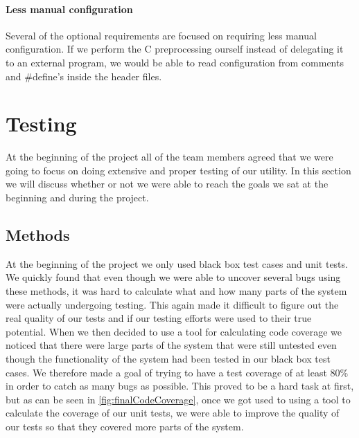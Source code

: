 \paragraph{Less manual configuration}
Several of the optional requirements are focused on requiring less manual
configuration. If we perform the C preprocessing ourself instead of delegating
it to an external program, we would be able to read configuration from
comments and \#define's inside the header files.

\section{Testing}
At the beginning of the project all of the team members agreed that we were going to focus on doing extensive and proper testing of our utility. In this section we will discuss whether or not we were able to reach the goals we sat at the beginning and during the project.

\subsection{Methods}
At the beginning of the project we only used black box test cases and unit tests. We quickly found that even though we were able to uncover several bugs using these methods, it was hard to calculate what and how many parts of the system were actually undergoing testing. This again made it difficult to figure out the real quality of our tests and if our testing efforts were used to their true potential. When we then decided to use a tool for calculating code coverage we noticed that there were large parts of the system that were still untested even though the functionality of the system had been tested in our black box test cases. We therefore made a goal of trying to have a test coverage of at least 80\% in order to catch as many bugs as possible. This proved to be a hard task at first, but as can be seen in \autoref{fig:finalCodeCoverage}, once we got used to using a tool to calculate the coverage of our unit tests, we were able to improve the quality of our tests so that they covered more parts of the system.

